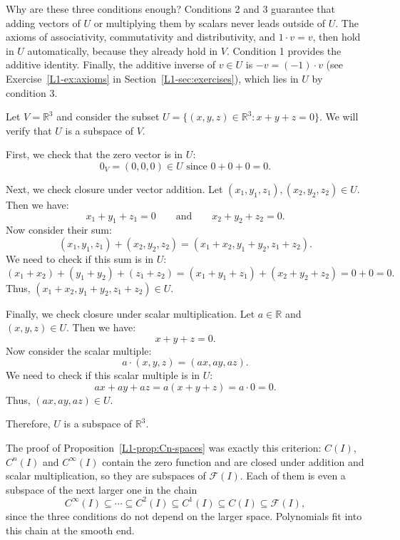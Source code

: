 \begin{remark}
    Why are these three conditions enough? Conditions 2 and 3 guarantee that adding vectors of $U$ or multiplying them by scalars never leads outside of $U$. The axioms of associativity, commutativity and distributivity, and $1 \cdot v = v$, then hold in $U$ automatically, because they already hold in $V$. Condition 1 provides the additive identity. Finally, the additive inverse of $v \in U$ is $-v = (-1) \cdot v$ (see Exercise~\ref{L1-ex:axioms} in Section~\ref{L1-sec:exercises}), which lies in $U$ by condition 3.
\end{remark}

\begin{example}
    Let $V = \mathbb{R}^3$ and consider the subset $U = \{(x, y, z) \in \mathbb{R}^3 : x + y + z = 0\}$. We will verify that $U$ is a subspace of $V$.

    First, we check that the zero vector is in $U$:
    \[0_V = (0, 0, 0) \in U \text{ since } 0 + 0 + 0 = 0.\]

    Next, we check closure under vector addition. Let $(x_1, y_1, z_1), (x_2, y_2, z_2) \in U$. Then we have:
    \[x_1 + y_1 + z_1 = 0 \qquad \text{and} \qquad x_2 + y_2 + z_2 = 0.\]
    Now consider their sum:
    \[(x_1, y_1, z_1) + (x_2, y_2, z_2) = (x_1 + x_2, y_1 + y_2, z_1 + z_2).\]
    We need to check if this sum is in $U$:
    \[(x_1 + x_2) + (y_1 + y_2) + (z_1 + z_2) = (x_1 + y_1 + z_1) + (x_2 + y_2 + z_2) = 0 + 0 = 0.\]
    Thus, $(x_1 + x_2, y_1 + y_2, z_1 + z_2) \in U$.

    Finally, we check closure under scalar multiplication. Let $a \in \mathbb{R}$ and $(x, y, z) \in U$. Then we have:
    \[x + y + z = 0.\]
    Now consider the scalar multiple:
    \[a \cdot (x, y, z) = (ax, ay, az).\]
    We need to check if this scalar multiple is in $U$:
    \[ax + ay + az = a(x + y + z) = a \cdot 0 = 0.\]
    Thus, $(ax, ay, az) \in U$.

    Therefore, $U$ is a subspace of $\mathbb{R}^3$.
\end{example}

The proof of Proposition~\ref{L1-prop:Cn-spaces} was exactly this criterion: $C(I)$, $C^n(I)$ and $C^\infty(I)$ contain the zero function and are closed under addition and scalar multiplication, so they are subspaces of $\mathcal{F}(I)$. Each of them is even a subspace of the next larger one in the chain
\[C^\infty(I) \subseteq \cdots \subseteq C^2(I) \subseteq C^1(I) \subseteq C(I) \subseteq \mathcal{F}(I),\]
since the three conditions do not depend on the larger space. Polynomials fit into this chain at the smooth end.

